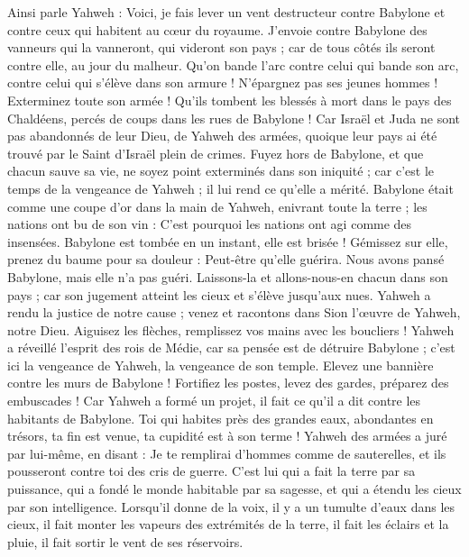 \begin{multicols}{2}
\VerseOne{}Ainsi parle Yahweh : Voici, je fais lever un vent destructeur contre Babylone et contre ceux qui habitent au cœur du royaume.
J'envoie contre Babylone des vanneurs qui la vanneront, qui videront son pays ; car de tous côtés ils seront contre elle, au jour du malheur.
Qu'on bande l'arc contre celui qui bande son arc, contre celui qui s'élève dans son armure ! N'épargnez pas ses jeunes hommes ! Exterminez toute son armée !
Qu'ils tombent les blessés à mort dans le pays des Chaldéens, percés de coups dans les rues de Babylone !
Car Israël et Juda ne sont pas abandonnés de leur Dieu, de Yahweh des armées, quoique leur pays ai été trouvé par le Saint d'Israël plein de crimes.
Fuyez hors de Babylone, et que chacun sauve sa vie, ne soyez point exterminés dans son iniquité ; car c'est le temps de la vengeance de Yahweh ; il lui rend ce qu'elle a mérité.
Babylone était comme une coupe d'or dans la main de Yahweh, enivrant toute la terre ; les nations ont bu de son vin : C'est pourquoi les nations ont agi comme des insensées.
Babylone est tombée en un instant, elle est brisée ! Gémissez sur elle, prenez du baume pour sa douleur : Peut-être qu'elle guérira.
Nous avons pansé Babylone, mais elle n'a pas guéri. Laissons-la et allons-nous-en chacun dans son pays ; car son jugement atteint les cieux et s'élève jusqu'aux nues.
Yahweh a rendu la justice de notre cause ; venez et racontons dans Sion l'œuvre de Yahweh, notre Dieu.
Aiguisez les flèches, remplissez vos mains avec les boucliers ! Yahweh a réveillé l'esprit des rois de Médie, car sa pensée est de détruire Babylone ; c'est ici la vengeance de Yahweh, la vengeance de son temple.
Elevez une bannière contre les murs de Babylone ! Fortifiez les postes, levez des gardes, préparez des embuscades ! Car Yahweh a formé un projet, il fait ce qu'il a dit contre les habitants de Babylone.
Toi qui habites près des grandes eaux, abondantes en trésors, ta fin est venue, ta cupidité est à son terme !
Yahweh des armées a juré par lui-même, en disant : Je te remplirai d'hommes comme de sauterelles, et ils pousseront contre toi des cris de guerre.
C'est lui qui a fait la terre par sa puissance, qui a fondé le monde habitable par sa sagesse, et qui a étendu les cieux par son intelligence.
Lorsqu'il donne de la voix, il y a un tumulte d'eaux dans les cieux, il fait monter les vapeurs des extrémités de la terre, il fait les éclairs et la pluie, il fait sortir le vent de ses réservoirs.

\end{multicols}
